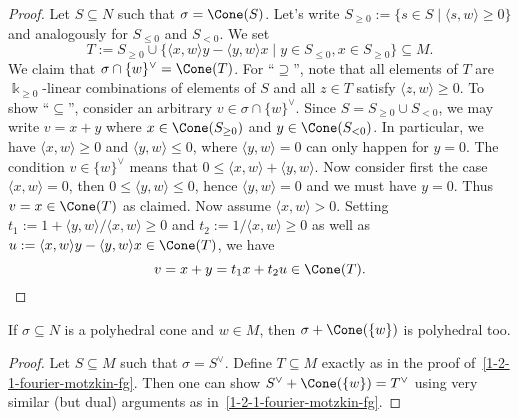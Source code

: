 \begin{proof}
  Let \( S \subseteq N \) such that \( \sigma = \Cone(S) \). Let's
  write \( S_{\geq 0} := \{s \in S \mid \langle s, w \rangle \geq 0 \}
  \) and analogously for \( S_{\leq 0} \) and \( S_{<0} \). We set
  \[
      T := S_{\geq 0} \cup \{\langle x,w \rangle y - \langle y,w
      \rangle x \mid y \in S_{\leq 0}, x \in S_{\geq 0} \} \subseteq
      M.
  \]
  We claim that \( \sigma \cap \{w\}^\vee = \Cone(T) \). For ``\(
  \supseteq \)'', note that all elements of \( T \) are \( \Bbbk_{\geq
  0} \)-linear combinations of elements of \( S \) and all \( z \in T
  \) satisfy \( \langle z,w \rangle \geq 0 \). To show ``\( \subseteq
  \)'', consider an arbitrary \( v \in \sigma \cap \{w\}^\vee \).
  Since \( S = S_{\geq 0} \cup S_{<0} \), we may write \( v = x + y \)
  where \( x \in \Cone(S_{\geq 0}) \) and \( y \in \Cone(S_{<0}) \).
  In particular, we have \( \langle x,w \rangle \geq 0 \) and \(
  \langle y,w \rangle \leq 0 \), where \( \langle y,w \rangle = 0 \)
  can only happen for \( y = 0 \). The condition \( v \in \{w\}^\vee
  \) means that \(0 \leq \langle x,w \rangle + \langle y,w \rangle \).
  Now consider first the case \( \langle x,w \rangle = 0 \), then \( 0
  \leq \langle y,w \rangle \leq 0 \), hence \( \langle y,w \rangle = 0 \)
  and we must have \( y = 0 \). Thus \( v = x \in \Cone(T) \) as
  claimed. Now assume \( \langle x,w \rangle > 0 \). Setting \( t_1 :=
  1 + \langle y,w \rangle / \langle x,w \rangle \geq 0\) and \( t_2 :=
  1 / \langle x,w \rangle \geq 0\) as well as \( u := \langle x,w
  \rangle y - \langle y,w \rangle x \in \Cone(T) \), we have
  \[
      v = x + y = t_1 x + t_2 u \in \Cone(T).
  \]
\end{proof}

\begin{proposition}
  \label{1-2-1-fourier-motzkin-polyhedral}
  If \( \sigma \subseteq N \) is a polyhedral cone and \( w \in M \),
  then \( \sigma + \Cone(\{w\}) \) is polyhedral too.
\end{proposition}
\begin{proof}
  Let \( S \subseteq M \) such that \( \sigma = S^\vee \). Define \( T
  \subseteq M \) exactly as in the proof
  of~\ref{1-2-1-fourier-motzkin-fg}. Then one can show \( S^\vee +
  \Cone(\{w\}) = T^\vee \) using very similar (but dual) arguments as
  in~\ref{1-2-1-fourier-motzkin-fg}.
\end{proof}

